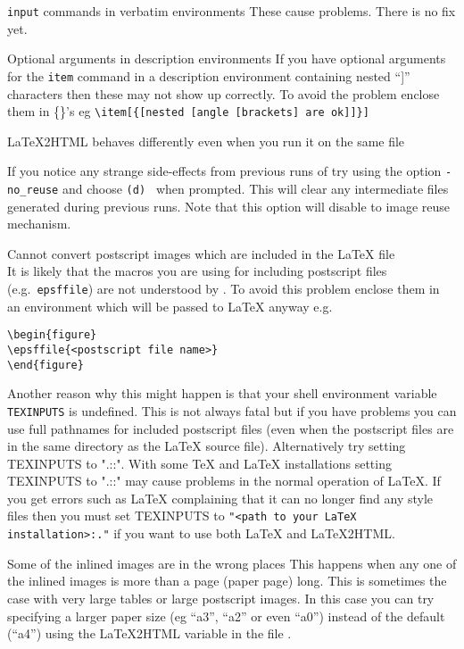 \begin{htmllist}
\item [\texttt{input} commands in verbatim environments]
These cause problems. There is no fix yet.

\item [Optional arguments in description environments]
If you have optional arguments for the \texttt{item} command in 
a description environment containing nested ``]'' characters then 
these may not show up correctly. To avoid the problem enclose them
in \{\}'s eg \verb+\item[{[nested [angle [brackets] are ok]]}]+

\item [LaTeX2HTML behaves differently even when you run it on the
same file]

If you notice any strange side-effects from previous runs of
\latextohtml{} try using the option \texttt{-no\_reuse} and choose 
\texttt{(d) } when prompted. This will 
clear any intermediate files generated during previous runs.
Note that this option will disable to image reuse mechanism.

\item [Cannot convert postscript images which are included
in the LaTeX file] \hfill \\
It is likely that the macros you are using for including postscript
files (e.g.\ \texttt{epsffile}) are not understood by \latextohtml.
To avoid this problem enclose them in an environment which will
be passed to LaTeX anyway e.g.
\begin{verbatim}
\begin{figure}
\epsffile{<postscript file name>}
\end{figure}
\end{verbatim}

Another reason why this might happen is that your shell 
environment variable 
\texttt{TEXINPUTS} is undefined. This is not always 
fatal but if you have problems you can use full
pathnames for included postscript files (even when the postscript
files are in the same directory as the LaTeX source file).
Alternatively try setting TEXINPUTS to ".::". 
With some TeX and LaTeX installations setting TEXINPUTS to 
".::" may cause problems in the normal operation of LaTeX.
If you get errors such as LaTeX complaining that it can no longer find
any style files then you must set TEXINPUTS to 
\verb|"<path to your LaTeX installation>:."|
if you want to use both LaTeX and LaTeX2HTML.

\item [Some of the inlined images are in the wrong places]
This happens when any one of the inlined images is more than a page
(paper page) long. This is sometimes the case with very large tables
or large postscript images. In this case you can try specifying 
a larger paper size (eg ``a3'', ``a2'' or even ``a0'') instead of
the default (``a4'') using the LaTeX2HTML variable  
in the file .


\end{htmllist}
